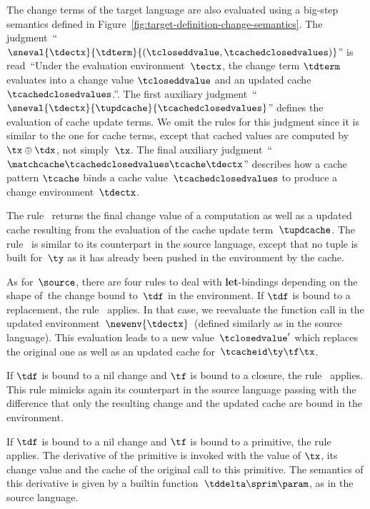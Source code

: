 The change terms of the target language are also evaluated using a
big-step semantics defined in
Figure~\ref{fig:target-definition-change-semantics}. The
judgment~``$\sneval{\tdectx}{\tdterm}{(\tcloseddvalue,
  \tcachedclosedvalues)}$'' is read~``Under the evaluation
environment~$\tectx$, the change term $\tdterm$ evaluates into a
change value $\tcloseddvalue$ and an updated cache
$\tcachedclosedvalues$.''. The first auxiliary
judgment~``$\sneval{\tdectx}{\tupdcache}{\tcachedclosedvalues}$''
defines the evaluation of cache update terms. We omit the
rules for this judgment since it is similar to the one for cache terms,
except that cached values are computed by~$\tx \oplus \tdx$, not simply~$\tx$.
%
The final auxiliary
judgment~``$\matchcache\tcachedclosedvalues\tcache\tdectx$'' describes
how a cache pattern $\tcache$ binds a cache
value~$\tcachedclosedvalues$ to produce a change
environment~$\tdectx$.

The rule~ returns the final change value of a
computation as well as a updated cache resulting from the evaluation
of the cache update term~$\tupdcache$.
%
The rule~ is similar to its counterpart in the
source language, except that no tuple is built for~$\ty$ as it has
already been pushed in the environment by the cache.

As for~$\source$, there are four rules to deal with {\bf
  let}-bindings depending on the shape of~the change bound to~$\tdf$
in the environment.
%
If $\tdf$ is bound to a replacement, the rule~ applies.
In that case, we reevaluate the function call in the updated
environment~$\newenv{\tdectx}$~(defined similarly as in the source
language). This evaluation leads to a new value~$\tclosedvalue'$
which replaces the original one as well as an updated cache
for~$\tcacheid\ty\tf\tx$.

If $\tdf$ is bound to a nil change and $\tf$ is bound to a closure, the
rule~ applies. This rule mimicks again its
counterpart in the source language passing with the difference that
only the resulting change and the updated cache are bound in the
environment.

If $\tdf$ is bound to a nil change and $\tf$ is bound to a primitive, the
rule~ applies. The derivative of the
primitive is invoked with the value of $\tx$, its change value and the
cache of the original call to this primitive. The semantics of this
derivative is given by a builtin function~$\tddelta\sprim\param$, as
in the source language.

